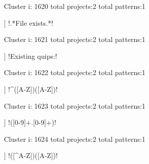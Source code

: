 Cluster i: 1620
total projects:2
total patterns:1
\begin{multicols}{1}
\begin{description}[noitemsep,topsep=0pt]
\item [[2] ] \cverb!.*File exists.*!
\end{description}
\end{multicols}







Cluster i: 1621
total projects:2
total patterns:1
\begin{multicols}{1}
\begin{description}[noitemsep,topsep=0pt]
\item [[2] ] \cverb!Existing quips:!
\end{description}
\end{multicols}







Cluster i: 1622
total projects:2
total patterns:1
\begin{multicols}{1}
\begin{description}[noitemsep,topsep=0pt]
\item [[2] ] \cverb!^([A-Z])([A-Z])!
\end{description}
\end{multicols}







Cluster i: 1623
total projects:2
total patterns:1
\begin{multicols}{1}
\begin{description}[noitemsep,topsep=0pt]
\item [[2] ] \cverb!([0-9]+.[0-9]+)!
\end{description}
\end{multicols}







Cluster i: 1624
total projects:2
total patterns:1
\begin{multicols}{1}
\begin{description}[noitemsep,topsep=0pt]
\item [[2] ] \cverb!([^A-Z])([A-Z])!
\end{description}
\end{multicols}







